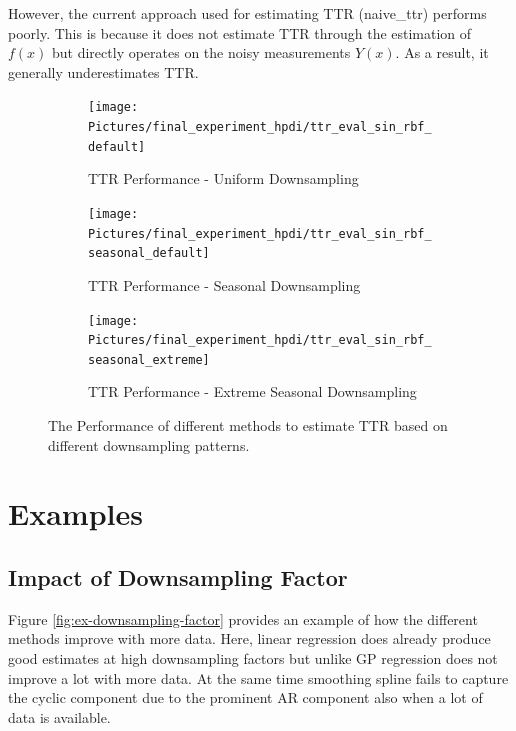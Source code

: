 However, the current approach used for estimating TTR (naive\_ttr) performs poorly.
This is because it does not estimate TTR through the estimation of $f(x)$ but directly
operates on the noisy measurements $Y(x)$. As a result, it generally underestimates TTR.


\begin{figure}[!htb]
\centering
\begin{subfigure}{\textwidth}
    \centering
    \texttt{[image: Pictures/final\_experiment\_hpdi/ttr\_eval\_sin\_rbf\_default]}
    \caption{TTR Performance - Uniform Downsampling}
    \label{fig:ttr-uniform-sampling-performance}
\end{subfigure}

\bigskip

\begin{subfigure}{\textwidth}
    \centering
    \texttt{[image: Pictures/final\_experiment\_hpdi/ttr\_eval\_sin\_rbf\_seasonal\_default]}
    \caption{TTR Performance - Seasonal Downsampling}
    \label{fig:ttr-seasonal-sampling-performance}
\end{subfigure}

\bigskip

\begin{subfigure}{\textwidth}
    \centering
    \texttt{[image: Pictures/final\_experiment\_hpdi/ttr\_eval\_sin\_rbf\_seasonal\_extreme]}
    \caption{TTR Performance - Extreme Seasonal Downsampling}
    \label{fig:ttr-extreme-seasonal-sampling-performance}
\end{subfigure}

\caption[TTR Performance]{The Performance of different methods to
estimate TTR based on different downsampling patterns.
}
\label{fig:ttr-performance}
\end{figure}


\section{Examples}


\subsection{Impact of Downsampling Factor}

Figure \ref{fig:ex-downsampling-factor} provides an example
of how the different methods improve with more data.
Here, linear regression
does already produce good estimates at high downsampling
factors but unlike GP regression does not improve a lot with more data.
At the same time smoothing spline fails to capture the cyclic component
due to the prominent AR component
also when a lot of data is available.

